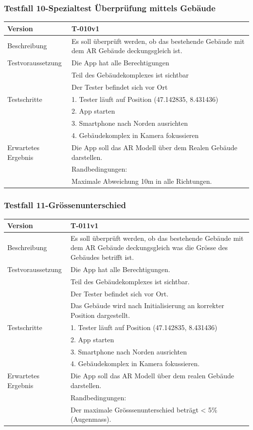 \documentclass[a4paper]{scrreprt}
\begin{document}
\subsubsection{Testfall 10-Spezialtest Überprüfung mittels Gebäude}
\begin{tabularx}{\textwidth}{|l|X|}
\hline
	Version &
	T-010v1 \\ 
\hline 
	Beschreibung & 
	Es soll überprüft werden, ob das bestehende Gebäude mit dem AR Gebäude deckungsgleich ist. \\ 
\hline 
	Testvoraussetzung &
	Die App hat alle Berechtigungen\\ &
	Teil des Gebäudekomplexes ist sichtbar\\ &
	Der Tester befindet sich vor Ort\\ 
\hline 
	Testschritte & 
		1. Tester läuft auf Position (47.142835, 8.431436)\\ &
		2. App starten\\ &
		3. Smartphone nach Norden ausrichten\\ &
		4. Gebäudekomplex in Kamera fokussieren\\
\hline
	Erwartetes Ergebnis &
	Die App soll das AR Modell über dem Realen Gebäude darstellen. \\ &
	Randbedingungen: \\ &
		Maximale Abweichung 10m in alle Richtungen.\\
\hline
\end{tabularx}
\subsubsection{Testfall 11-Grössenunterschied}
\begin{tabularx}{\textwidth}{|l|X|}
\hline 
	Version &
	T-011v1 \\ 
\hline 
	Beschreibung & 
	Es soll überprüft werden, ob das bestehende Gebäude mit dem AR Gebäude deckungsgleich was die Grösse des Gebäudes betrifft ist. \\ 
\hline
    Testvoraussetzung &
	Die App hat alle Berechtigungen.\\ &
	Teil des Gebäudekomplexes ist sichtbar.\\ &
	Der Tester befindet sich vor Ort. \\ &
	Das Gebäude wird nach Initialisierung an korrekter Position dargestellt. \\
\hline 
	Testschritte & 
		1. Tester läuft auf Position (47.142835, 8.431436)\\ &
		2. App starten\\ &
		3. Smartphone nach Norden ausrichten\\ &
		4. Gebäudekomplex in Kamera fokussieren. \\
\hline
	Erwartetes Ergebnis &
	Die App soll das AR Modell über dem realen Gebäude darstellen. \\ &
	Randbedingungen: \\ &
		Der maximale Grösssenunterschied beträgt < 5\% (Augenmass). \\ 
\hline 
\end{tabularx}
\end{document}
